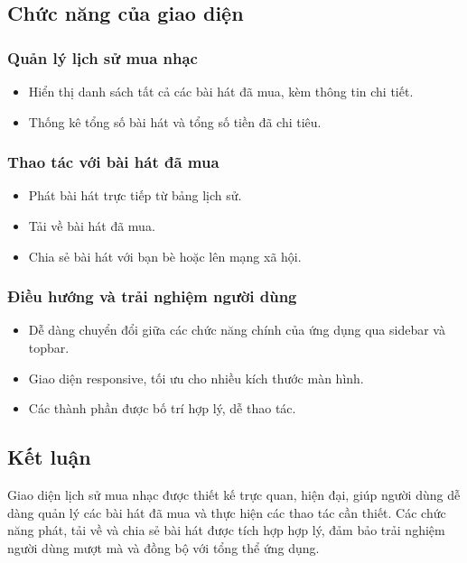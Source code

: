 \documentclass{book}
\begin{document}
\subsection{Chức năng của giao diện}

\subsubsection{Quản lý lịch sử mua nhạc}
\begin{itemize}
    \item Hiển thị danh sách tất cả các bài hát đã mua, kèm thông tin chi tiết.
    \item Thống kê tổng số bài hát và tổng số tiền đã chi tiêu.
\end{itemize}

\subsubsection{Thao tác với bài hát đã mua}
\begin{itemize}
    \item Phát bài hát trực tiếp từ bảng lịch sử.
    \item Tải về bài hát đã mua.
    \item Chia sẻ bài hát với bạn bè hoặc lên mạng xã hội.
\end{itemize}

\subsubsection{Điều hướng và trải nghiệm người dùng}
\begin{itemize}
    \item Dễ dàng chuyển đổi giữa các chức năng chính của ứng dụng qua sidebar và topbar.
    \item Giao diện responsive, tối ưu cho nhiều kích thước màn hình.
    \item Các thành phần được bố trí hợp lý, dễ thao tác.
\end{itemize}

\subsection{Kết luận}
Giao diện lịch sử mua nhạc được thiết kế trực quan, hiện đại, giúp người dùng dễ dàng quản lý các bài hát đã mua và thực hiện các thao tác cần thiết. Các chức năng phát, tải về và chia sẻ bài hát được tích hợp hợp lý, đảm bảo trải nghiệm người dùng mượt mà và đồng bộ với tổng thể ứng dụng.
\end{document}

